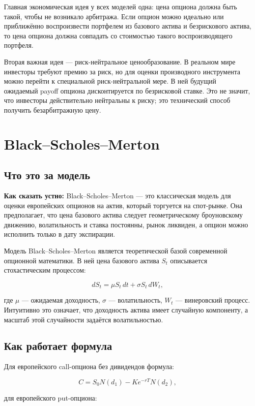\documentclass[11pt,a4paper]{article}
\newcommand{\speechbox}[1]{%
  \noindent\colorbox{softblue}{%
    \parbox{\dimexpr\linewidth-2\fboxsep\relax}{\textbf{Как сказать устно:} #1}%
  }\par\vspace{0.2em}
}
\begin{document}
Главная экономическая идея у всех моделей одна: цена опциона должна быть такой, чтобы не возникало арбитража. Если опцион можно идеально или приближённо воспроизвести портфелем из базового актива и безрискового актива, то цена опциона должна совпадать со стоимостью такого воспроизводящего портфеля.

Вторая важная идея --- риск-нейтральное ценообразование. В реальном мире инвесторы требуют премию за риск, но для оценки производного инструмента можно перейти к специальной риск-нейтральной мере. В ней будущий ожидаемый payoff опциона дисконтируется по безрисковой ставке. Это не значит, что инвесторы действительно нейтральны к риску; это технический способ получить безарбитражную цену.

\section{Black--Scholes--Merton}

\subsection{Что это за модель}

\speechbox{Black--Scholes--Merton --- это классическая модель для оценки европейских опционов на актив, который торгуется на спот-рынке. Она предполагает, что цена базового актива следует геометрическому броуновскому движению, волатильность и ставка постоянны, рынок ликвиден, а опцион можно исполнить только в дату экспирации.}

Модель Black--Scholes--Merton является теоретической базой современной опционной математики. В ней цена базового актива $S_t$ описывается стохастическим процессом:

\[
dS_t=\mu S_t\,dt+\sigma S_t\,dW_t,
\]

где $\mu$ --- ожидаемая доходность, $\sigma$ --- волатильность, $W_t$ --- винеровский процесс. Интуитивно это означает, что доходность актива имеет случайную компоненту, а масштаб этой случайности задаётся волатильностью.

\subsection{Как работает формула}

Для европейского call-опциона без дивидендов формула:

\[
C=S_0N(d_1)-Ke^{-rT}N(d_2),
\]

для европейского put-опциона:
\end{document}
